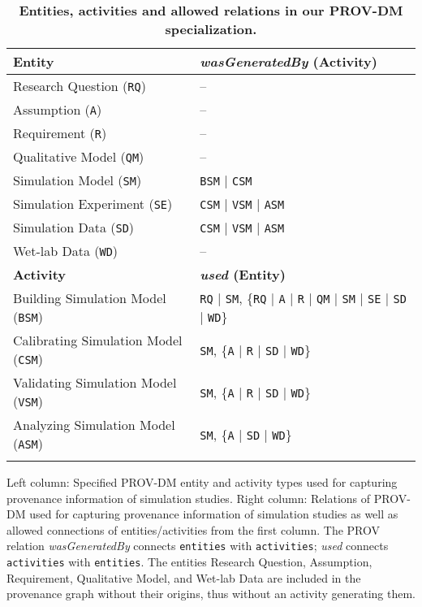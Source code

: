 \documentclass[10pt,letterpaper]{article}
\newcommand{\RQ}{Research Question}
\newcommand{\A}{Assumption}
\newcommand{\R}{Requirement}
\newcommand{\QM}{Qualitative Model}
\newcommand{\SM}{Simulation Model}
\newcommand{\SE}{Simulation Experiment}
\newcommand{\SD}{Simulation Data}
\newcommand{\WD}{Wet-lab Data}
\newcommand{\BSM}{Building Simulation Model}
\newcommand{\CSM}{Calibrating Simulation Model}
\newcommand{\VSM}{Validating Simulation Model}
\newcommand{\ASM}{Analyzing Simulation Model}
\begin{document}
\begin{table}[!ht]
\caption{{\bf Entities, activities and allowed relations in our PROV-DM specialization.}}
\begin{tabular}{ll}
\toprule
\textbf{Entity}  & \textbf{\textit{wasGeneratedBy} (Activity)} \\
\midrule
\RQ{} (\texttt{RQ}) & -- \\
\A{}  (\texttt{A})  & -- \\
\R{}  (\texttt{R}) & -- \\
\QM{} (\texttt{QM}) & -- \\
\SM{} (\texttt{SM}) & \texttt{BSM} $\vert$ \texttt{CSM} \\
\SE{} (\texttt{SE}) & \texttt{CSM} $\vert$ \texttt{VSM} $\vert$ \texttt{ASM} \\
\SD{} (\texttt{SD}) & \texttt{CSM} $\vert$ \texttt{VSM} $\vert$ \texttt{ASM} \\
\WD{} (\texttt{WD}) & -- \\
\midrule
\textbf{Activity}  & \textbf{\textit{used} (Entity)} \\
\midrule
\BSM{} (\texttt{BSM}) & \texttt{RQ} $\vert$ \texttt{SM}, \{\texttt{RQ} $\vert$ \texttt{A} $\vert$ \texttt{R} $\vert$ \texttt{QM} $\vert$ \texttt{SM} $\vert$ \texttt{SE} $\vert$ \texttt{SD} $\vert$ \texttt{WD}\}\\
\CSM{} (\texttt{CSM}) & \texttt{SM}, \{\texttt{A} $\vert$ \texttt{R} $\vert$ \texttt{SD} $\vert$ \texttt{WD}\}\\
\VSM{} (\texttt{VSM}) & \texttt{SM}, \{\texttt{A} $\vert$ \texttt{R} $\vert$ \texttt{SD} $\vert$ \texttt{WD}\}\\
\ASM{} (\texttt{ASM}) & \texttt{SM}, \{\texttt{A} $\vert$ \texttt{SD} $\vert$ \texttt{WD}\}\\
\bottomrule
\addlinespace\addlinespace
\end{tabular}
\begin{flushleft}
Left column: Specified PROV-DM entity and activity types used for capturing provenance information of simulation studies.
Right column: Relations of PROV-DM used for capturing provenance information of simulation studies as well as allowed connections of entities/activities from the first column.
The PROV relation \textit{wasGeneratedBy} connects \texttt{entities} with \texttt{activities}; \textit{used} connects \texttt{activities} with \texttt{entities}.
The entities \RQ{}, \A{}, \R{}, \QM{}, and \WD{} are included in the provenance graph without their origins, thus without an activity generating them.

\end{flushleft}
\end{table}
\end{document}
